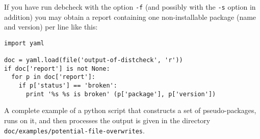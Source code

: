 \begin{example}
  If you have run debcheck with the option \texttt{-f} (and possibly
  with the \texttt{-s} option in addition) you may obtain a report
  containing one non-installable package (name and version) per line
  like this:
  
\begin{verbatim}
import yaml

doc = yaml.load(file('output-of-distcheck', 'r'))
if doc['report'] is not None:
  for p in doc['report']:
    if p['status'] == 'broken':
      print '%s %s is broken' (p['package'], p['version'])
\end{verbatim}
\end{example}

A complete example of a python script that constructs a set of
pseudo-packages, runs \debcheck{} on it, and then processes the output
is given in the directory
\texttt{doc/examples/potential-file-overwrites}.
